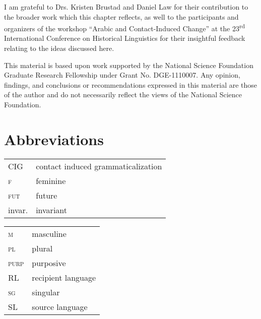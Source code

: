 \documentclass[output=paper]{langsci/langscibook}
\begin{document}
I am grateful to Drs. Kristen Brustad and Daniel Law for their contribution to the broader work which this chapter reflects, as well to the participants and organizers of the workshop “Arabic and Contact-Induced Change” at the 23\textsuperscript{rd} International Conference on Historical Linguistics for their insightful feedback relating to the ideas discussed here.

This material is based upon work supported by the National Science Foundation Graduate Research Fellowship under Grant No. DGE-1110007. Any opinion, findings, and conclusions or recommendations expressed in this material are those of the author and do not necessarily reflect the views of the National Science Foundation.

\section*{Abbreviations}


\begin{tabularx}{.45\textwidth}{lQ}
CIG & contact induced grammaticalization \\
\textsc{f} & feminine \\
\textsc{fut} & future \\
invar. & invariant \\
\end{tabularx}
\begin{tabularx}{.45\textwidth}{lQ}
\textsc{m} & masculine \\
\textsc{pl} & plural \\
\textsc{purp} & purposive \\
RL & recipient language \\
\textsc{sg} & singular \\
SL & source language \\
\end{tabularx}



\sloppy
\printbibliography[heading=subbibliography,notkeyword=this] 
\end{document}
